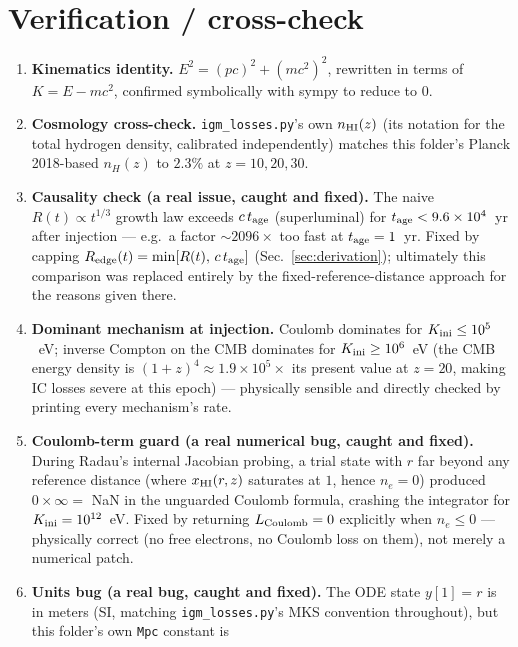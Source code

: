 \documentclass[11pt,a4paper]{article}
\begin{document}
\section{Verification / cross-check}
\label{sec:verification}

\begin{enumerate}
\item \textbf{Kinematics identity.} $E^2=(pc)^2+(mc^2)^2$, rewritten in terms of $K=E-mc^2$, confirmed
      symbolically with sympy to reduce to $0$.
\item \textbf{Cosmology cross-check.} \texttt{igm\_losses.py}'s own $n_{\rm HI}(z)$ (its notation for the
      total hydrogen density, calibrated independently) matches this folder's Planck 2018-based $n_H(z)$
      to $2.3\%$ at $z=10,20,30$.
\item \textbf{Causality check (a real issue, caught and fixed).} The naive $R(t)\propto t^{1/3}$ growth law
      exceeds $c\,t_{\rm age}$ (superluminal) for $t_{\rm age}<9.6\times10^4$~yr after injection --- e.g.\ a
      factor $\sim2096\times$ too fast at $t_{\rm age}=1$~yr. Fixed by capping
      $R_{\rm edge}(t)=\min[R(t),\,c\,t_{\rm age}]$ (Sec.~\ref{sec:derivation}); ultimately this comparison
      was replaced entirely by the fixed-reference-distance approach for the reasons given there.
\item \textbf{Dominant mechanism at injection.} Coulomb dominates for $K_{\rm ini}\le10^5$~eV; inverse
      Compton on the CMB dominates for $K_{\rm ini}\ge10^6$~eV (the CMB energy density is
      $(1+z)^4\approx1.9\times10^5\times$ its present value at $z=20$, making IC losses severe at this
      epoch) --- physically sensible and directly checked by printing every mechanism's rate.
\item \textbf{Coulomb-term guard (a real numerical bug, caught and fixed).} During Radau's internal Jacobian
      probing, a trial state with $r$ far beyond any reference distance (where $x_{\rm HI}(r,z)$ saturates at
      $1$, hence $n_e=0$) produced $0\times\infty=$ NaN in the unguarded Coulomb formula, crashing the
      integrator for $K_{\rm ini}=10^{12}$~eV. Fixed by returning $L_{\rm Coulomb}=0$ explicitly when
      $n_e\le0$ --- physically correct (no free electrons, no Coulomb loss on them), not merely a numerical
      patch.
\item \textbf{Units bug (a real bug, caught and fixed).} The ODE state $y[1]=r$ is in meters (SI, matching
      \texttt{igm\_losses.py}'s MKS convention throughout), but this folder's own \texttt{Mpc} constant is

\end{enumerate}
\end{document}
